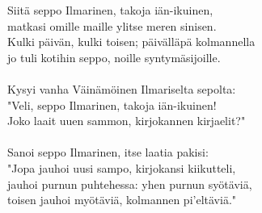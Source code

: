 Siitä seppo Ilmarinen, takoja iän-ikuinen,                        \\
matkasi omille maille ylitse meren sinisen.                       \\
Kulki päivän, kulki toisen; päivälläpä kolmannella                \\
jo tuli kotihin seppo, noille syntymäsijoille.                    \\
                                                                  \\
Kysyi vanha Väinämöinen Ilmariselta sepolta:                      \\
"Veli, seppo Ilmarinen, takoja iän-ikuinen!                       \\
Joko laait uuen sammon, kirjokannen kirjaelit?"                   \\
                                                                  \\
Sanoi seppo Ilmarinen, itse laatia pakisi:                        \\
"Jopa jauhoi uusi sampo, kirjokansi kiikutteli,                   \\
jauhoi purnun puhtehessa: yhen purnun syötäviä,                   \\
toisen jauhoi myötäviä, kolmannen pi'eltäviä."                    \\